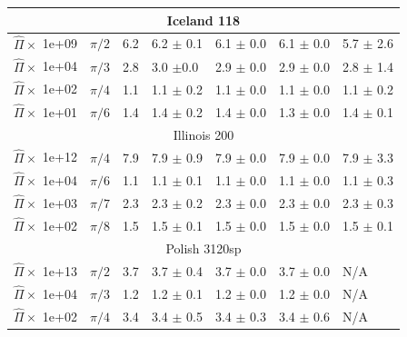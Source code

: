 \begin{table}[t]
{{\begin{tabular}{l|l|l|l|l|l|l}
          \hline
          \multicolumn{7}{c}{Iceland 118}\\
          \hline
$\hat\Pi \times$ 1e+09 & $\pi/2$\hspace{-4mm}&6.2\!\! & 6.2 $\pm$ 0.1 & 6.1 $\pm$ 0.0 & 6.1 $\pm$ 0.0 & 5.7 $\pm$ 2.6\\
$\hat\Pi \times$ 1e+04 & $\pi/3$\hspace{-4mm}&2.8\!\! & 3.0 $\pm$0.0 & 2.9 $\pm$ 0.0 & 2.9 $\pm$ 0.0 & 2.8 $\pm$ 1.4\\
$\hat\Pi \times$ 1e+02 & $\pi/4$\hspace{-4mm}&1.1\!\! & 1.1 $\pm$ 0.2 & 1.1 $\pm$ 0.0 & 1.1 $\pm$ 0.0 & 1.1 $\pm$ 0.2\\
$\hat\Pi \times$ 1e+01 & $\pi/6$\hspace{-4mm}&1.4\!\! & 1.4 $\pm$ 0.2 & 1.4 $\pm$ 0.0 & 1.3 $\pm$ 0.0 & 1.4 $\pm$ 0.1\\
\hline 
          \multicolumn{7}{c}{Illinois 200}\\
\hline
$\hat\Pi\times$ 1e+12 & $\pi/4$\hspace{-4mm}&7.9\!\! & 7.9 $\pm$ 0.9 & 7.9 $\pm$ 0.0 & 7.9 $\pm$ 0.0 & 7.9 $\pm$ 3.3\\
$\hat\Pi\times$ 1e+04 & $\pi/6$\hspace{-4mm}&1.1\!\! & 1.1 $\pm$ 0.1 & 1.1 $\pm$ 0.0 & 1.1 $\pm$ 0.0 & 1.1 $\pm$ 0.3\\
$\hat\Pi\times$ 1e+03 & $\pi/7$\hspace{-4mm}&2.3\!\! & 2.3 $\pm$ 0.2 & 2.3 $\pm$ 0.0 & 2.3 $\pm$ 0.0 & 2.3 $\pm$ 0.3\\
$\hat\Pi\times$ 1e+02 & $\pi/8$\hspace{-4mm}&1.5\!\! & 1.5 $\pm$ 0.1 & 1.5 $\pm$ 0.0 & 1.5 $\pm$ 0.0 & 1.5 $\pm$ 0.1\\
\hline
\multicolumn{7}{c}{Polish 3120sp}\\
\hline
$\hat\Pi\times$ 1e+13 & $\pi/2$\hspace{-4mm}&3.7\!\! & 3.7 $\pm$ 0.4 & 3.7 $\pm$ 0.0 & 3.7 $\pm$ 0.0 & N/A\\
$\hat\Pi\times$ 1e+04 & $\pi/3$\hspace{-4mm}&1.2\!\! & 1.2 $\pm$ 0.1 & 1.2 $\pm$ 0.0 & 1.2 $\pm$ 0.0 & N/A\\
$\hat\Pi\times$ 1e+02 & $\pi/4$\hspace{-4mm}&3.4\!\! & 3.4 $\pm$ 0.5 & 3.4 $\pm$ 0.3 & 3.4 $\pm$ 0.6 & N/A
    \end{tabular}}
    }
\end{table}




